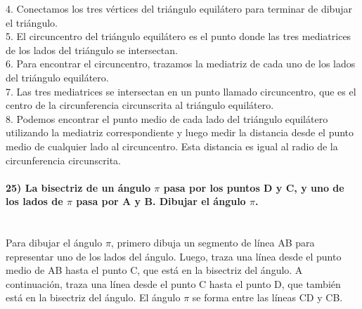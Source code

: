 \documentclass{article}
\begin{document}
4. Conectamos los tres vértices del triángulo equilátero para terminar de dibujar el triángulo.\\
5. El circuncentro del triángulo equilátero es el punto donde las tres mediatrices de los lados del triángulo se intersectan.\\
6. Para encontrar el circuncentro, trazamos la mediatriz de cada uno de los lados del triángulo equilátero.\\
7. Las tres mediatrices se intersectan en un punto llamado circuncentro, que es el centro de la circunferencia circunscrita al triángulo equilátero.\\
8. Podemos encontrar el punto medio de cada lado del triángulo equilátero utilizando la mediatriz correspondiente y luego medir la distancia desde el punto medio de cualquier lado al circuncentro. Esta distancia es igual al radio de la circunferencia circunscrita.\\
\\

{\bf 25) La bisectriz de un ángulo $\pi$ pasa por los puntos D y C, y uno de los lados de $\pi$ pasa por A y B. Dibujar el ángulo $\pi$.} \\
\\
\\
Para dibujar el ángulo $\pi$, primero dibuja un segmento de línea AB para representar uno de los lados del ángulo. Luego, traza una línea desde el punto medio de AB hasta el punto C, que está en la bisectriz del ángulo. A continuación, traza una línea desde el punto C hasta el punto D, que también está en la bisectriz del ángulo. El ángulo $\pi$ se forma entre las líneas CD y CB.\\ 
\end{document}
